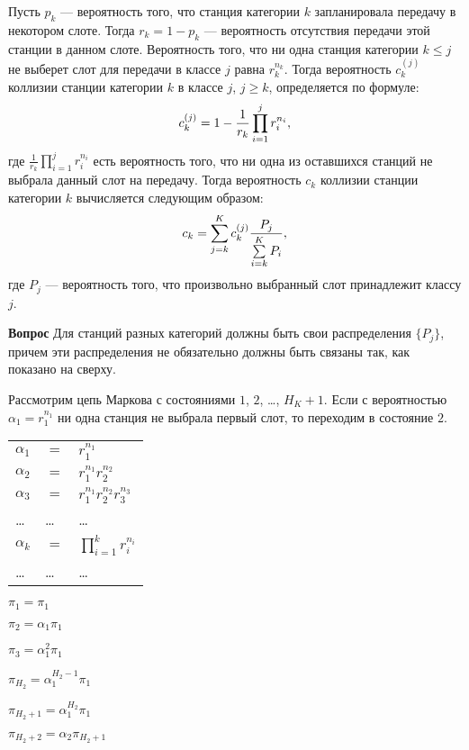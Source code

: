 Пусть $p_k$ --- вероятность того, что станция категории $k$ запланировала передачу в некотором слоте. Тогда $r_k = 1 - p_k$ --- вероятность отсутствия передачи этой станции в данном слоте. Вероятность того, что ни одна станция категории $k \leqslant j$ не выберет слот для передачи в классе $j$ равна $r_k^{n_k}$. Тогда вероятность
$c_k^{(j)}$ коллизии станции категории $k$ в классе $j$, $j \geqslant k$, определяется по формуле:
\begin{equation}
\notag
c_k^{(j)} = 1 - \frac{1}{r_k}\prod\limits_{i = 1}^{j} r_i^{n_i},
\end{equation} 
где $\frac{1}{r_k}\prod\limits_{i = 1}^{j} r_i^{n_i}$ есть вероятность того, что ни одна из оставшихся станций не выбрала данный слот на передачу.
Тогда вероятность $c_k$ коллизии станции категории $k$ вычисляется следующим образом:
\begin{equation}
\notag
c_k = \sum\limits_{j = k}^{K} c_k^{(j)} \frac{P_j}{\sum\limits_{i = k}^{K} P_i}, 
\end{equation}
где $P_j$ --- вероятность того, что произвольно выбранный слот принадлежит классу $j$.

\textbf{Вопрос} Для станций разных категорий должны быть свои распределения $\{P_j\}$, причем эти распределения не обязательно должны быть связаны так, как показано на сверху.


Рассмотрим цепь Маркова с состояниями $1$, $2$, \dots, $H_K+1$.
Если с вероятностью $\alpha_1 = r_1^{n_1}$ ни одна станция не выбрала первый слот, то переходим в состояние $2$.

\begin{tabular}{l l l}
$\alpha_1$  &$=$ &$r_1^{n_1}$  \\
$\alpha_2$	&$=$ &$r_1^{n_1}r_2^{n_2}$ \\
$\alpha_3$	&$=$ &$r_1^{n_1}r_2^{n_2}r_3^{n_3}$ \\
\dots	&\dots	&\dots \\
$\alpha_k$	&$=$ &$\prod\limits_{i = 1}^{k} r_i^{n_i}$ \\
\dots	&\dots	&\dots \\
\end{tabular}

$\pi_1 = \pi_1$

$\pi_2 = \alpha_1 \pi_1$

$\pi_3 = \alpha_1^2 \pi_1$

$\pi_{H_2} = \alpha_1^{H_2-1} \pi_1$

$\pi_{H_2+1} = \alpha_1^{H_2} \pi_1$

$\pi_{H_2+2} = \alpha_2 \pi_{H_2+1}$

